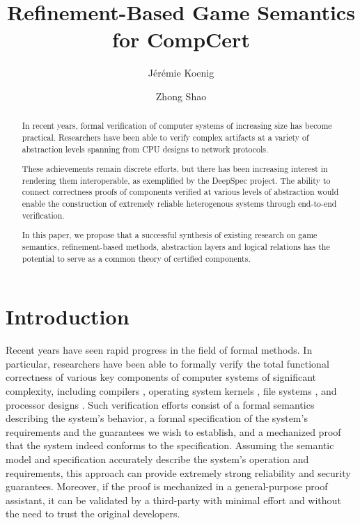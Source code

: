 \documentclass[acmsmall,timestamp,review]{acmart}
\title{Refinement-Based Game Semantics for CompCert}
\author{J\'er\'emie Koenig}
\affiliation{Yale University}
\author{Zhong Shao}
\affiliation{Yale University}
\begin{document}
\begin{abstract} %
In recent years,
formal verification of computer systems
of increasing size has become practical.
Researchers have been able to verify complex artifacts
at a variety of abstraction levels spanning
from CPU designs to network protocols.

These achievements remain discrete efforts, but
there has been increasing interest in rendering them interoperable,
as exemplified by the DeepSpec project.
The ability to connect correctness proofs of components
verified at various levels of abstraction
would enable the construction of extremely reliable heterogenous systems
through end-to-end verification.

In this paper,
we propose that a successful synthesis of existing research on
game semantics,
refinement-based methods,
abstraction layers and
logical relations
has the potential to serve as a common theory
of certified components.
\end{abstract}

\maketitle

\section{Introduction} %


Recent years have seen rapid progress in the field of formal methods.
In particular,
researchers have been able to formally verify the
total functional correctness
of various key components of computer systems
of significant complexity,
including
compilers \cite{compcert, vellvm},
operating system kernels \cite{sel4, popl15},
file systems \cite{fscq}, and
processor designs \cite{safe}.
Such verification efforts
consist of
a formal semantics describing the system's behavior,
a formal specification of the system's requirements and
the guarantees we wish to establish,
and a mechanized proof that
the system indeed conforms to the specification.
Assuming the semantic model and specification accurately describe
the system's operation and requirements,
this approach can provide
extremely strong reliability and security guarantees.
Moreover,
if the proof is mechanized in a general-purpose proof assistant,
it can be validated by a third-party with minimal effort
and without the need to trust the original developers.
\end{document}
